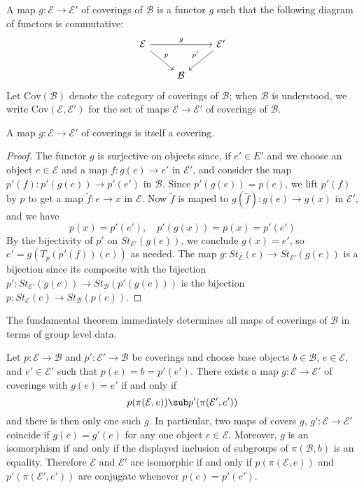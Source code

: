 \begin{definition}
A map $g:\mathcal{E}\to\mathcal{E}'$ of coverings of $\mathcal{B}$ is a functor $g$ such that the following diagram of functors is commutative:
\[\begin{tikzcd}
\mathcal{E}\ar[rd,"p"]\ar[rr,"g"]&&\mathcal{E}'\ar[ld,swap,"p'"]\\
&\mathcal{B}&
\end{tikzcd}\]
Let $\mathrm{Cov}(\mathcal{B})$ denote the category of coverings of $\mathcal{B}$; when $\mathcal{B}$ is understood, we write $\mathrm{Cov}(\mathcal{E},\mathcal{E}')$ for the set of maps $\mathcal{E}\to\mathcal{E}'$ of coverings of $\mathcal{B}$.
\end{definition}
\begin{lemma}
A map $g:\mathcal{E}\to\mathcal{E}'$ of coverings is itself a covering.
\end{lemma}
\begin{proof}
The functor $g$ is surjective on objects since, if $e'\in E'$ and we choose an object $e\in\mathcal{E}$ and a map $f:g(e)\to e'$ in $\mathcal{E}'$, and consider the map $p'(f):p'(g(e))\to p'(e')$ in $\mathcal{B}$. Since $p'(g(e))=p(e)$, we lift $p'(f)$ by $p$ to get a map $\widetilde{f}:e\to x$ in $\mathcal{E}$. Now $\widetilde{f}$ is maped to $g(\widetilde{f}):g(e)\to g(x)$ in $\mathcal{E}'$, and we have
\[p(x)=p'(e'),\quad p'(g(x))=p(x)=p'(e')\]
By the bijectivity of $p'$ on $St_{\mathcal{E}'}(g(e))$, we conclude $g(x)=e'$, so $e'=g(T_p(p'(f))(e))$ as needed. The map $g:St_{\mathcal{E}}(e)\to St_{\mathcal{E}'}(g(e))$ is a bijection since its composite with the bijection $p':St_{\mathcal{E}'}(g(e))\to St_{\mathcal{B}}(p'(g(e)))$ is the bijection $p:St_{\mathcal{E}}(e)\to St_{\mathcal{B}}(p(e))$.
\end{proof}
The fundamental theorem immediately determines all maps of coverings of $\mathcal{B}$ in terms of group level data.
\begin{theorem}\label{fundamental theo}
Let $p:\mathcal{E}\to\mathcal{B}$ and $p':\mathcal{E}'\to\mathcal{B}$ be coverings and choose base objects $b\in\mathcal{B}$, $e\in\mathcal{E}$, and $e'\in\mathcal{E}'$ such that $p(e)=b=p'(e')$. There exists a map $g:\mathcal{E}\to\mathcal{E}'$ of coverings with $g(e)=e'$ if and only if
\[p(\pi(\mathcal{E},e))\sub p'(\pi(\mathcal{E}',e'))\]
and there is then only one such $g$. In particular, two maps of covers $g$, $g':\mathcal{E}\to\mathcal{E}'$ coincide if $g(e)=g'(e)$ for any one object $e\in\mathcal{E}$. Moreover, $g$ is an isomorphism if and only if the displayed inclusion of subgroups of $\pi(\mathcal{B},b)$ is an equality. Therefore $\mathcal{E}$ and $\mathcal{E}'$ are isomorphic if and only if $p(\pi(\mathcal{E},e))$ and $p'(\pi(\mathcal{E}',e'))$ are conjugate whenever $p(e)=p'(e')$.
\end{theorem}

